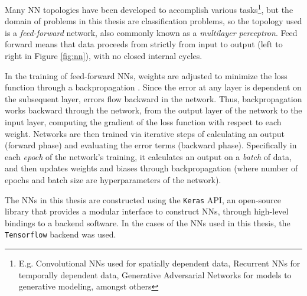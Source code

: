 Many \gls{NN} topologies have been developed to accomplish various tasks\footnote{E.g. Convolutional \glspl{NN} used for spatially dependent data, Recurrent \glspl{NN} for temporally dependent data, Generative Adversarial Networks for models to generative modeling, amongst others}, but the domain of problems in this thesis are classification problems, so the topology used is a \textit{feed-forward} network, also commonly known as a \textit{multilayer perceptron}. Feed forward means that data proceeds from strictly from input to output (left to right in Figure \ref{fig:nn}), with no closed internal cycles.

In the training of feed-forward \glspl{NN}, weights are adjusted to minimize the loss function through a backpropagation \cite{backprop}. Since the error at any layer is dependent on the subsequent layer, errors flow backward in the network. Thus, backpropagation works backward through the network, from the output layer of the network to the input layer, computing the gradient of the loss function with respect to each weight. Networks are then trained via iterative steps of calculating an output (forward phase) and evaluating the error terms (backward phase). Specifically in each \textit{epoch} of the network's training, it calculates an output on a \textit{batch} of data, and then updates weights and biases through backpropagation (where number of epochs and batch size are hyperparameters of the network).

The \glspl{NN} in this thesis are constructed using the \texttt{Keras} \gls{API}, an open-source library that provides a modular interface to construct \glspl{NN}, through high-level bindings to a backend software. In the cases of the \glspl{NN} used in this thesis, the \texttt{Tensorflow} \cite{Tensorflow} backend was used.